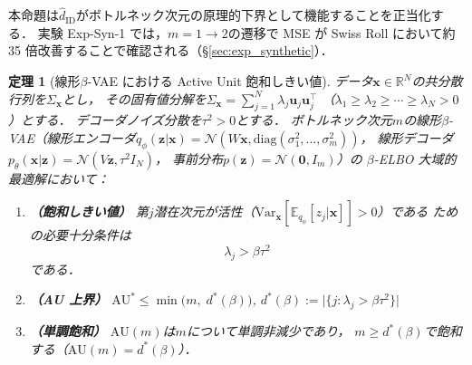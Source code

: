 \documentclass[11pt,a4paper]{jsarticle}
\newtheorem{theorem}{定理}
\newcommand{\R}{\mathbb{R}}
\begin{document}
本命題は$\hat{d}_\mathrm{ID}$がボトルネック次元の原理的下界として機能することを正当化する．
実験 Exp-Syn-1 では，$m = 1 \to 2$の遷移で MSE が Swiss Roll において約 35 倍改善することで確認される（§\ref{sec:exp_synthetic}）．

\begin{theorem}[線形$\beta$-VAE における Active Unit 飽和しきい値]\label{thm:linear_vae}
データ$\boldsymbol{x} \in \R^N$の共分散行列を$\Sigma_{\boldsymbol{x}}$とし，
その固有値分解を$\Sigma_{\boldsymbol{x}} = \sum_{j=1}^{N} \lambda_j \boldsymbol{u}_j \boldsymbol{u}_j^\top$
（$\lambda_1 \geq \lambda_2 \geq \cdots \geq \lambda_N > 0$）とする．
デコーダノイズ分散を$\tau^2 > 0$とする．
ボトルネック次元$m$の線形$\beta$-VAE（線形エンコーダ$q_\phi(\boldsymbol{z}|\boldsymbol{x}) = \mathcal{N}(W\boldsymbol{x}, \mathrm{diag}(\sigma_1^2,\ldots,\sigma_m^2))$，
線形デコーダ$p_\theta(\boldsymbol{x}|\boldsymbol{z}) = \mathcal{N}(V\boldsymbol{z}, \tau^2 I_N)$，
事前分布$p(\boldsymbol{z}) = \mathcal{N}(\boldsymbol{0}, I_m)$）の
$\beta$-ELBO 大域的最適解において：

\begin{enumerate}
  \item \textbf{（飽和しきい値）} 第$j$潜在次元が活性（$\mathrm{Var}_{\boldsymbol{x}}[\mathbb{E}_{q_\phi}[z_j|\boldsymbol{x}]] > 0$）である
        ための必要十分条件は
        \begin{equation}
          \lambda_j > \beta \tau^2 \label{eq:au_threshold}
        \end{equation}
        である．
  \item \textbf{（AU 上界）}
        $\mathrm{AU}^* \leq \min\bigl(m,\; d^*(\beta)\bigr)$,\quad
        $d^*(\beta) := \bigl|\{j : \lambda_j > \beta\tau^2\}\bigr|$
  \item \textbf{（単調飽和）}
        $\mathrm{AU}(m)$は$m$について単調非減少であり，
        $m \geq d^*(\beta)$で飽和する（$\mathrm{AU}(m) = d^*(\beta)$）．
\end{enumerate}
\end{theorem}
\end{document}
